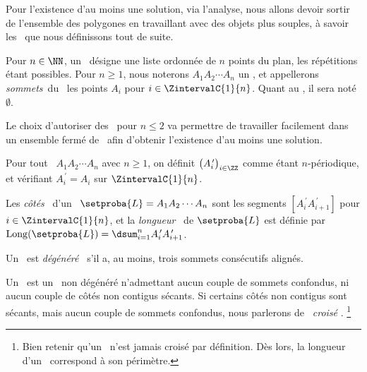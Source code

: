 Pour l'existence d'au moins une solution, via l'analyse, nous allons devoir sortir de l'ensemble des polygones en travaillant avec des objets plus souples, à savoir les \ncycles\ que nous définissons tout de suite.




\begin{defi}
	Pour $n \in \NN$, un \og \emph{\ncycle} \fg\ désigne une liste ordonnée de $n$ points du plan, les répétitions étant possibles.
	Pour $n \geq 1$, nous noterons $A_1 A_2 \cdots A_n$ un \ncycle, et appellerons \og \emph{sommets}\fg\ du \ncycle\ les points $A_i$ pour $i \in \ZintervalC{1}{n}$.
	Quant au , il sera noté $\emptyset$.
\end{defi}


\begin{remark}
	Le choix d'autoriser des \ncycles\ pour $n \leq 2$ va permettre de travailler facilement dans un ensemble fermé de \ncycles\ afin d'obtenir l'existence d'au moins une solution. 
\end{remark}


\begin{defi}
    Pour tout \ncycle\ $A_1 A_2 \cdots A_n$ avec $n \geq 1$, on définit $\big( A^{\,\prime}_i \big)_{i \in \ZZ}$ comme étant $n$-périodique, et vérifiant $A^{\,\prime}_{i} = A_i$ sur $\ZintervalC{1}{n}$.
\end{defi}


\begin{defi}
	Les \og \emph{côtés} \fg\ d'un \ncycle\ $\setproba{L} = A_1 A_2 \cdots A_n$ sont les segments
	$[A^{\,\prime}_i A^{\,\prime}_{i+1}]$ pour $i \in \ZintervalC{1}{n}$,
	et
	la \og \emph{longueur} \fg\ de $\setproba{L}$ est définie par $\cyclelen{\setproba{L}} = \dsum_{i=1}^{n} A^{\,\prime}_i A^{\,\prime}_{i+1}$.
\end{defi}




\begin{defi}
	Un \ncycle\ est \og \emph{dégénéré} \fg\ s'il a, au moins, trois sommets consécutifs alignés.
\end{defi}




\begin{defi}
	Un \og \emph{\ngone} \fg\ est un \ncycle\ non dégénéré n'admettant aucun couple de sommets confondus, ni aucun couple de côtés non contigus sécants.
	Si certains côtés non contigus sont sécants, mais aucun couple de sommets confondus, nous parlerons de \og \emph{\ngone\ croisé} \fg.%
	\footnote{
		Bien retenir qu'un \ngone\ n'est jamais croisé par définition.
		Dès lors, la longueur d'un \ngone\ correspond à son périmètre.
	}
\end{defi}


